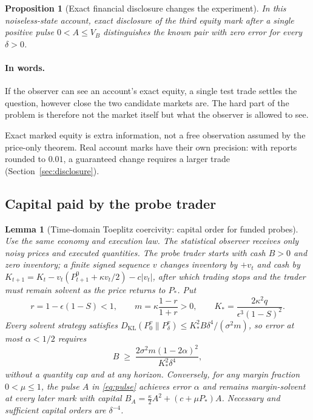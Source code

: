 \documentclass[12pt]{article}
\newtheorem{proposition}[theorem]{Proposition}
\newtheorem{lemma}[theorem]{Lemma}
\theoremstyle{definition}
\theoremstyle{remark}
\newcommand{\KL}{D_{\mathrm{KL}}}
\begin{document}
\begin{proposition}[Exact financial disclosure changes the experiment]\label{prop:disclosure}
In this noiseless-state account, exact disclosure of the third equity mark after a single positive pulse $0<A\le V_B$ distinguishes the known pair with zero error for every $\delta>0$.
\end{proposition}

\paragraph{In words.} If the observer can see an account's exact equity, a single test trade settles the question, however close the two candidate markets are. The hard part of the problem is therefore not the market itself but what the observer is allowed to see.

Exact marked equity is extra information, not a free observation assumed by the price-only theorem. Real account marks have their own precision: with reports rounded to $0.01$, a guaranteed change requires a larger trade (Section~\ref{sec:disclosure}).

\subsection{Capital paid by the probe trader}

\begin{lemma}[Time-domain Toeplitz coercivity: capital order for funded probes]\label{thm:capital}
Use the same economy and execution law. The statistical observer receives only noisy prices and executed quantities. The probe trader starts with cash $B>0$ and zero inventory; a finite signed sequence $v$ changes inventory by $+v_t$ and cash by $K_{t+1}=K_t-v_t(P^0_{t+1}+\kappa v_t/2)-c|v_t|$, after which trading stops and the trader must remain solvent as the price returns to $P_*$. Put
\[
r=1-\epsilon(1-S)<1,\qquad m=\kappa\frac{1-r}{1+r}>0,\qquad K_*=\frac{2\kappa^2q}{\epsilon^3(1-S)^2}.
\]
Every solvent strategy satisfies $\KL(P_0^v\|P_\delta^v)\le K_*^2B\delta^4/(\sigma^2m)$, so error at most $\alpha<1/2$ requires
\begin{equation}\label{eq:Bmin}
B\;\ge\;\frac{2\sigma^2m(1-2\alpha)^2}{K_*^2\delta^4},
\end{equation}
without a quantity cap and at any horizon. Conversely, for any margin fraction $0<\mu\le1$, the pulse $A$ in \eqref{eq:pulse} achieves error $\alpha$ and remains margin-solvent at every later mark with capital $B_A=\tfrac{\kappa}{2}A^2+(c+\mu P_*)A$. Necessary and sufficient capital orders are $\delta^{-4}$.
\end{lemma}
\end{document}
